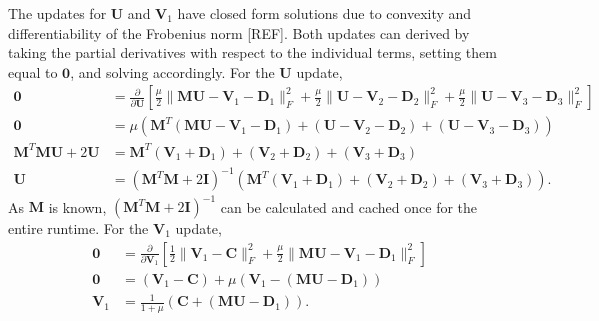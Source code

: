 The updates for $\mathbf{U}$ and $\mathbf{V}_1$ have closed form solutions due to convexity and differentiability of the Frobenius norm [REF]. Both updates can derived by taking the partial derivatives with respect to the individual terms, setting them equal to $\mathbf{0}$, and solving accordingly. For the $\mathbf{U}$ update,
\begin{equation*}
  \begin{aligned}
    \mathbf{0} &= \frac{\partial}{\partial \mathbf{U}}\left[\frac{\mu}{2} \|\mathbf{MU} - \mathbf{V}_1 - \mathbf{D}_1\|_F^2  + \frac{\mu}{2} \|\mathbf{U} - \mathbf{V}_2 - \mathbf{D}_2\|_F^2  + \frac{\mu}{2} \|\mathbf{U} - \mathbf{V}_3 - \mathbf{D}_3\|_F^2\right]
    \\
    \mathbf{0} &= \mu \left(\mathbf{M}^T(\mathbf{MU}-\mathbf{V}_1-\mathbf{D}_1) + (\mathbf{U}-\mathbf{V}_2-\mathbf{D}_2) + (\mathbf{U}-\mathbf{V}_3-\mathbf{D}_3)\right)
    \\
    \mathbf{M}^T\mathbf{MU} + 2\mathbf{U} &= \mathbf{M}^T(\mathbf{V}_1+\mathbf{D}_1) + (\mathbf{V}_2+\mathbf{D}_2) + (\mathbf{V}_3+\mathbf{D}_3)
    \\
    \mathbf{U} &= (\mathbf{M}^T \mathbf{M} + 2\mathbf{I})^{-1}(\mathbf{M}^T(\mathbf{V}_1+\mathbf{D}_1) + (\mathbf{V}_2+\mathbf{D}_2) + (\mathbf{V}_3+\mathbf{D}_3)).
  \end{aligned}
\end{equation*}
As $\mathbf{M}$ is known, $(\mathbf{M}^T \mathbf{M} + 2\mathbf{I})^{-1}$ can be calculated and cached once for the entire runtime. For the $\mathbf{V}_1$ update,
$$
\begin{aligned}
   \mathbf{0} &= \frac{\partial}{\partial \mathbf{V}_1} \left[ \frac{1}{2}\|\mathbf{V}_1-\mathbf{C}\|_F^2 + \frac{\mu}{2} \|\mathbf{MU} - \mathbf{V}_1 - \mathbf{D}_1 \|_F^2 \right]
  \\
  \mathbf{0} &= (\mathbf{V}_1 - \mathbf{C}) + \mu(\mathbf{V}_1 - (\mathbf{MU} - \mathbf{D}_1))
  \\
  \mathbf{V}_1 &= \frac{1}{1+\mu} \left(\mathbf{C} + (\mathbf{MU} - \mathbf{D}_1)\right).
\end{aligned}
$$

